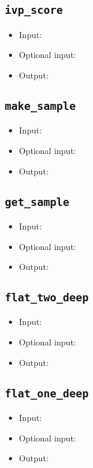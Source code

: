 \documentclass[10pt]{article}
\theoremstyle{definition}
\numberwithin{theorem}{section}
\numberwithin{definition}{section}
\numberwithin{lemma}{section}
\numberwithin{corollary}{section}
\numberwithin{clm}{section}
\numberwithin{rmk}{section}
\begin{document}
\cprotect \subsection{\verb|ivp_score|}

\begin{itemize}
	\item Input: 
	\item Optional input:
	\item Output: 
\end{itemize}

\cprotect \subsection{\verb|make_sample|}

\begin{itemize}
	\item Input: 
	\item Optional input:
	\item Output: 
\end{itemize}

\cprotect \subsection{\verb|get_sample|}

\begin{itemize}
	\item Input: 
	\item Optional input:
	\item Output: 
\end{itemize}

\cprotect \subsection{\verb|flat_two_deep|}

\begin{itemize}
	\item Input: 
	\item Optional input:
	\item Output: 
\end{itemize}

\cprotect \subsection{\verb|flat_one_deep|}

\begin{itemize}
	\item Input: 
	\item Optional input:
	\item Output: 
\end{itemize}
\end{document}
